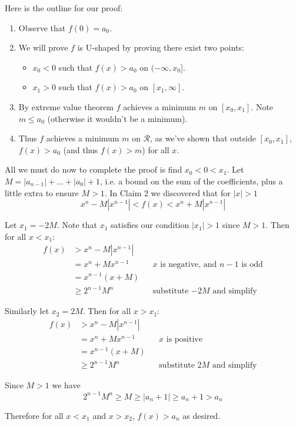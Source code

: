 \vs

Here is the outline for our proof:

\begin{enumerate}
\item Observe that $f(0)=a_0$.
\item We will prove $f$ is U-shaped by proving there exist two points:
  \begin{itemize}
  \item $x_0<0$ such that $f(x)>a_0$ on $(-\infty, x_0]$.
  \item $x_1>0$ such that $f(x)>a_0$ on $[x_1, \infty]$.
  \end{itemize}
\item By extreme value theorem $f$ achieves a minimum $m$ on
  $[x_0, x_1]$. Note $m\leq a_{0}$ (otherwise it wouldn't be a minimum).
\item Thus $f$ achieves a minimum $m$ on $\mathcal{R}$, as we've shown that
  outside $[x_0, x_1]$, $f(x)>a_{0}$ (and thus $f(x)>m$) for all $x$.
\end{enumerate}

All we must do now to complete the proof is find $x_0<0<x_1$. Let
$M=|a_{n-1}|+\ldots+|a_0|+1$, i.e. a bound on the sum of the coefficients,
plus a little extra to ensure $M>1$. In Claim 2 we discovered that for
$|x|>1$
\[x^{n}-M|x^{n-1}|<f(x)<x^{n}+M|x^{n-1}|\]

Let $x_1=-2M$. Note that $x_1$ satisfies our condition $|x_1|>1$ since
$M>1$. Then for all $x<x_1$:
\begin{align*}
  f(x)&>x^{n}-M|x^{n-1}|\\
      &=x^n+Mx^{n-1}&&\text{$x$ is negative, and $n-1$ is odd}\\
      &=x^{n-1}(x+M)\\
      &\geq 2^{n-1}M^n&&\text{substitute $-2M$ and simplify}
\end{align*}

Similarly let $x_2=2M$. Then for all $x>x_1$:
\begin{align*}
  f(x)&>x^{n}-M|x^{n-1}|\\
      &=x^n+Mx^{n-1}&&\text{$x$ is positive}\\
      &=x^{n-1}(x+M)\\
      &\geq 2^{n-1}M^n&&\text{substitute $2M$ and simplify}
\end{align*}

Since $M>1$ we have
\[2^{n-1}M^n\geq M\geq |a_n+1|\geq a_n+1>a_n\]

Therefore for all $x<x_1$ and $x>x_2$, $f(x)>a_{n}$ as desired.

